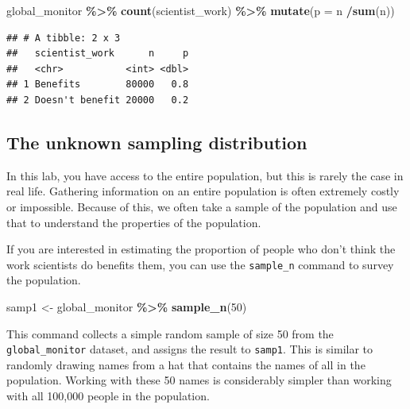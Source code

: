 \documentclass[
]{article}
\newenvironment{Shaded}{\begin{snugshade}}{\end{snugshade}}
\newcommand{\AttributeTok}[1]{\textcolor[rgb]{0.13,0.29,0.53}{#1}}
\newcommand{\DecValTok}[1]{\textcolor[rgb]{0.00,0.00,0.81}{#1}}
\newcommand{\FunctionTok}[1]{\textcolor[rgb]{0.13,0.29,0.53}{\textbf{#1}}}
\newcommand{\NormalTok}[1]{#1}
\newcommand{\OtherTok}[1]{\textcolor[rgb]{0.56,0.35,0.01}{#1}}
\newcommand{\SpecialCharTok}[1]{\textcolor[rgb]{0.81,0.36,0.00}{\textbf{#1}}}
\begin{document}
\begin{Shaded}
\begin{Highlighting}[]
\NormalTok{global\_monitor }\SpecialCharTok{\%\textgreater{}\%}
  \FunctionTok{count}\NormalTok{(scientist\_work) }\SpecialCharTok{\%\textgreater{}\%}
  \FunctionTok{mutate}\NormalTok{(}\AttributeTok{p =}\NormalTok{ n }\SpecialCharTok{/}\FunctionTok{sum}\NormalTok{(n))}
\end{Highlighting}
\end{Shaded}

\begin{verbatim}
## # A tibble: 2 x 3
##   scientist_work      n     p
##   <chr>           <int> <dbl>
## 1 Benefits        80000   0.8
## 2 Doesn't benefit 20000   0.2
\end{verbatim}

\subsection{The unknown sampling
distribution}\label{the-unknown-sampling-distribution}

In this lab, you have access to the entire population, but this is
rarely the case in real life. Gathering information on an entire
population is often extremely costly or impossible. Because of this, we
often take a sample of the population and use that to understand the
properties of the population.

If you are interested in estimating the proportion of people who don't
think the work scientists do benefits them, you can use the
\texttt{sample\_n} command to survey the population.

\begin{Shaded}
\begin{Highlighting}[]
\NormalTok{samp1 }\OtherTok{\textless{}{-}}\NormalTok{ global\_monitor }\SpecialCharTok{\%\textgreater{}\%}
  \FunctionTok{sample\_n}\NormalTok{(}\DecValTok{50}\NormalTok{)}
\end{Highlighting}
\end{Shaded}

This command collects a simple random sample of size 50 from the
\texttt{global\_monitor} dataset, and assigns the result to
\texttt{samp1}. This is similar to randomly drawing names from a hat
that contains the names of all in the population. Working with these 50
names is considerably simpler than working with all 100,000 people in
the population.
\end{document}
